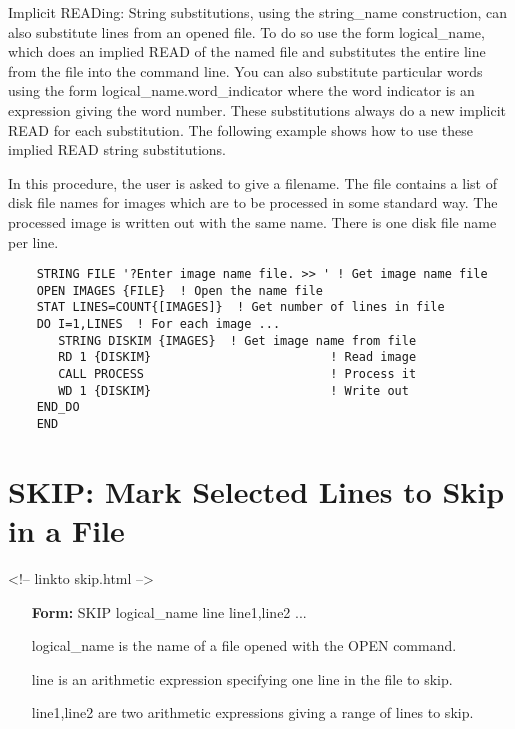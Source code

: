 
Implicit READing: String substitutions, using the {string\_name}
construction, can also substitute lines from an opened file.  To do so use
the form {logical\_name}, which does an implied READ of the named file and
substitutes the entire line from the file into the command line.  You can
also substitute particular words using the form
{logical\_name.word\_indicator} where the word indicator is an expression
giving the word number.  These substitutions always do a new implicit READ
for each substitution.  The following example shows how to use these
implied READ string substitutions.

In this procedure, the user is asked to give a filename.  The file contains
a list of disk file names for images which are to be processed in some
standard way.  The processed image is written out with the same name.
There is one disk file name per line.

\begin{verbatim}
    STRING FILE '?Enter image name file. >> ' ! Get image name file
    OPEN IMAGES {FILE}  ! Open the name file
    STAT LINES=COUNT{[IMAGES]}  ! Get number of lines in file
    DO I=1,LINES  ! For each image ...
       STRING DISKIM {IMAGES}  ! Get image name from file
       RD 1 {DISKIM}                         ! Read image
       CALL PROCESS                          ! Process it
       WD 1 {DISKIM}                         ! Write out
    END_DO
    END
\end{verbatim}

\section{SKIP: Mark Selected Lines to Skip in a File}
\begin{rawhtml}
<!-- linkto skip.html -->
\end{rawhtml}
\begin{itemize}
  \item[\textbf{Form: }SKIP logical\_name line line1,line2 ...\hfill]{}
  \item[logical\_name]{is the name of a file opened with the OPEN command.}
  \item[line]{is an arithmetic expression specifying one line in the file
       to skip.}  
  \item[line1,line2]{are two arithmetic expressions giving a range of lines
       to skip.}
\end{itemize}

